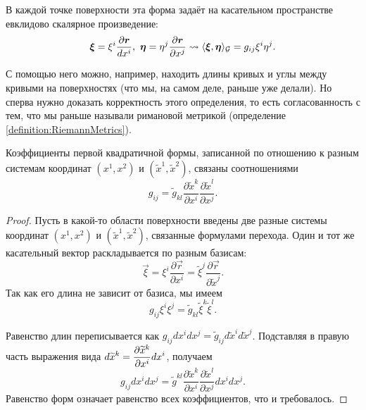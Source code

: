 В каждой точке поверхности эта форма задаёт на касательном пространстве евклидово скалярное произведение:
\[
	\vec{\xi} = \xi^i\frac{\partial \vec{r}}{dx^i},\ \vec{\eta} = \eta^j\frac{\partial \vec{r}}{\partial x^j} \leadsto \langle\vec{\xi}, \vec{\eta}\rangle_\G = g_{ij}\xi^i\eta^j.
\]

С помощью него можно, например, находить длины кривых и углы между кривыми на поверхностях (что мы, на самом деле, раньше уже делали). Но сперва нужно доказать корректность этого определения, то есть согласованность с тем, что мы раньше называли римановой метрикой (определение \ref{definition:RiemannMetrics}).

\begin{proposition}
	Коэффициенты первой квадратичной формы, записанной по отношению к разным системам координат $(x^1, x^2)$ и $(\widetilde{x}^1, \widetilde{x}^2)$, связаны соотношениями\footnotemark
	\begin{equation} \label{eq:QTensorLaw}
		g_{ij} = \widetilde{g}_{kl}\frac{\partial\widetilde{x}^k}{\partial x^i}\frac{\partial \widetilde{x}^l}{\partial x^j}.
	\end{equation}
\end{proposition}


\begin{proof}
	Пусть в какой-то области поверхности введены две разные системы координат $(x^1, x^2)$ и $(\widetilde{x}^1, \widetilde{x}^2)$, связанные формулами перехода. Один и тот же касательный вектор раскладывается по разным базисам:
	\[
		\vec{\xi} = \xi^i\frac{\partial\vec{r}}{\partial x^i} = \widetilde{\xi}^j\frac{\partial\vec{r}}{\partial\widetilde{x}^j}.
	\]
	Так как его длина не зависит от базиса, мы имеем
	\[
		g_{ij}\xi^i\xi^j = \widetilde{g}_{kl}\widetilde{\xi}^k\widetilde{\xi}^l.
	\]

	Равенство длин переписывается как $g_{ij}dx^idx^j = \widetilde{g}_{ij}d\widetilde{x}^id\widetilde{x}^j$. Подставляя в правую часть выражения вида $\displaystyle d\widetilde{x}^k = \frac{\partial\widetilde{x}^k}{\partial x^i}dx^i$, получаем
	\[
		g_{ij}dx^idx^j = \widetilde{g}^{kl}\frac{\partial\widetilde{x}^k}{\partial x^i}\frac{\partial\widetilde{x}^l}{\partial x^j}dx^idx^j.
	\]
	Равенство форм означает равенство всех коэффициентов, что и требовалось.
\end{proof}

